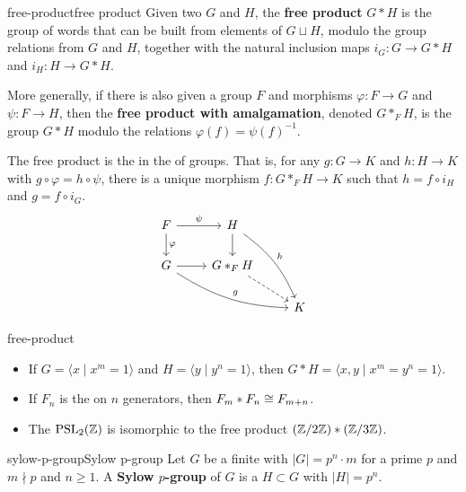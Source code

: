 \begin{topic}{free-product}{free product}
    Given two  $G$ and $H$, the \textbf{free product} $G * H$ is the group of words that can be built from elements of $G \sqcup H$, modulo the group relations from $G$ and $H$, together with the natural inclusion maps $i_G \colon G \to G * H$ and $i_H \colon H \to G * H$.
    
    More generally, if there is also given a group $F$ and morphisms $\varphi \colon F \to G$ and $\psi \colon F \to H$, then the \textbf{free product with amalgamation}, denoted $G *_F H$, is the group $G * H$ modulo the relations $\varphi(f) = \psi(f)^{-1}$.
    
    The free product is the  in the  of groups. That is, for any $g \colon G \to K$ and $h \colon H \to K$ with $g \circ \varphi = h \circ \psi$, there is a unique morphism $f \colon G *_F H \to K$ such that $h = f \circ i_H$ and $g = f \circ i_G$.
    \[ \svg \begin{tikzcd} F \arrow{r}{\psi} \arrow{d}{\varphi} & H \arrow{d} \arrow[bend left=15]{ddr}{h} & \\ G \arrow{r} \arrow[bend right=15]{drr}{g} & G *_F H \arrow[dashed]{dr} & \\ & & K \end{tikzcd} \]
\end{topic}

\begin{example}{free-product}
    \begin{itemize}
        \item If $G = \langle x \mid x^m = 1 \rangle$ and $H = \langle y \mid y^n = 1 \rangle$, then $G * H = \langle x, y \mid x^m = y^n = 1 \rangle$.
        \item If $F_n$ is the  on $n$ generators, then $F_m * F_n \cong F_{m + n}$.
        \item The  $\textup{PSL}_2(\mathbb{Z})$ is isomorphic to the free product $(\mathbb{Z}/2\mathbb{Z}) * (\mathbb{Z}/3\mathbb{Z})$.
    \end{itemize}
\end{example}

\begin{topic}{sylow-p-group}{Sylow p-group}
    Let $G$ be a finite  with $|G| = p^n \cdot m$ for a prime $p$ and $m \nmid p$ and $n \ge 1$. A \textbf{Sylow $p$-group} of $G$ is a  $H \subset G$ with $|H| = p^n$.
\end{topic}


